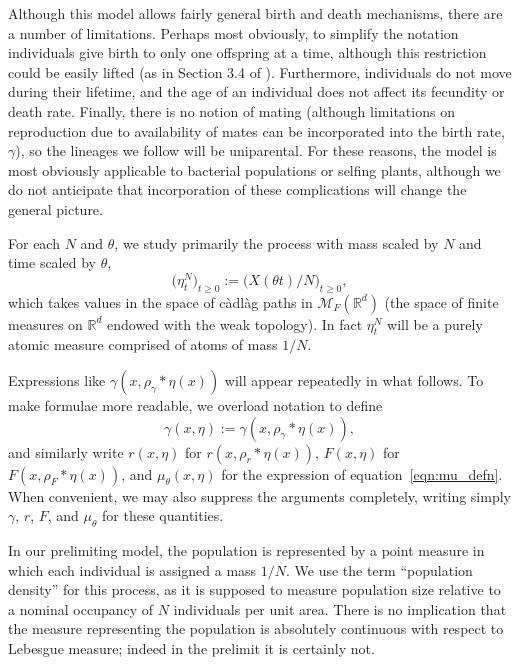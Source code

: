 \documentclass[EJP]{ejpecp} %
\newcommand{\IR}{\mathbb R}
\newcommand{\kernel}{\rho}  %
\newcommand{\smooth}[1]{\kernel_{#1} \! * \!}  %
\newcommand{\measures}{\mathcal{M}_F(\IR^d)} %
\begin{document}
\begin{remark}
Although this model allows fairly general birth and death mechanisms,
there are a number of limitations.
Perhaps most obviously, to simplify the notation
individuals give birth to only one offspring at a time,
although this restriction could be easily lifted
(as in Section 3.4 of \cite{etheridge/kurtz:2019}).
Furthermore, individuals do not move during their lifetime,
and the age of an individual does not affect its fecundity or death rate.
Finally, there is no notion of mating
(although limitations on reproduction due to availability of mates can be incorporated into the birth rate, $\gamma$),
so the lineages we follow will be uniparental.
For these reasons, the model is most obviously applicable to bacterial populations or selfing plants,
although we do not anticipate that incorporation of these complications
will change the general picture.
\end{remark}


For each $N$ and $\theta$, we study primarily the process
with mass scaled by $N$ and time scaled by $\theta$,
$$ \big(\eta^N_t\big)_{t\geq 0} := \big(X(\theta t)/N\big)_{t\geq 0} , $$ 
which takes values in the space of c\`adl\`ag paths in
$\measures$ (the space of finite measures on $\IR^d$
endowed with the weak topology). In fact $\eta_t^N$ will be a purely atomic
measure comprised of atoms of mass $1/N$.

\begin{notation}
Expressions like $\gamma(x, \smooth{\gamma} \eta(x))$ will appear repeatedly in what follows.
To make formulae more readable, we overload notation to define
$$
    \gamma(x, \eta) := \gamma(x, \smooth{\gamma} \eta(x)) ,
$$
and similarly write $r(x, \eta)$ for $r(x, \smooth{r} \eta(x))$,
$F(x, \eta)$ for $F(x, \smooth{F} \eta(x))$,
and $\mu_\theta(x, \eta)$ for the expression of equation~\eqref{eqn:mu_defn}.
When convenient, we may also suppress the arguments completely,
writing simply $\gamma$, $r$, $F$, and $\mu_\theta$ for these quantities.
\end{notation}

\begin{remark}
In our prelimiting model,
the population is represented by a point measure in which each
individual is assigned a mass $1/N$. We use the term ``population density'' for
this process, as it is supposed to measure population size relative to a 
nominal occupancy of $N$ individuals per unit area. There is no implication 
that the measure representing the population is absolutely continuous with
respect to Lebesgue measure; indeed in the prelimit it is certainly not.
\end{remark} 
\end{document}
